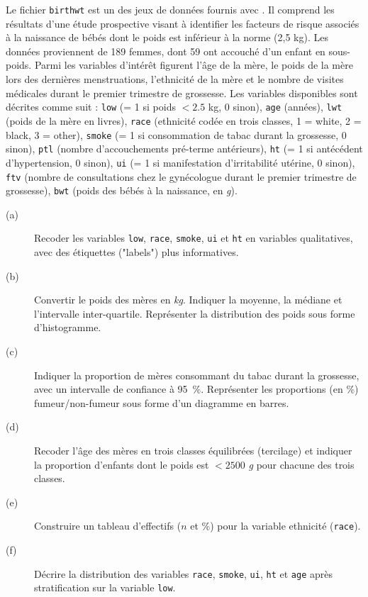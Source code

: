 \begin{exo}\label{exo:2.4}
Le fichier \texttt{birthwt} est un des jeux de données fournis avec \R. Il
comprend les résultats d'une étude prospective visant à identifier les
facteurs de risque associés à la naissance de bébés dont le poids est
inférieur à la norme (2,5 kg). Les données proviennent de 189 femmes, dont
59 ont accouché d'un enfant en sous-poids. Parmi les variables d'intérêt
figurent l'âge de la mère, le poids de la mère lors des dernières
menstruations, l'ethnicité de la mère et le nombre de visites médicales
durant le premier trimestre de grossesse.\autocite{hosmer89}
Les variables disponibles sont décrites comme suit : \texttt{low} (= 1 si
poids $<2.5$ kg, 0 sinon), \texttt{age} (années), \texttt{lwt} (poids de la
mère en livres), \texttt{race} (ethnicité codée en trois classes, 1 = white,
2 = black, 3 = other), \texttt{smoke} (= 1 si consommation de tabac durant
la grossesse, 0 sinon), \texttt{ptl} (nombre d'accouchements pré-terme
antérieurs), \texttt{ht} (= 1 si antécédent d'hypertension, 0 sinon),
\texttt{ui} (= 1 si manifestation d'irritabilité utérine, 0 sinon),
\texttt{ftv} (nombre de consultations chez le gynécologue durant le premier
trimestre de grossesse), \texttt{bwt} (poids des bébés à la naissance, en
\emph{g}).
\begin{description}
\item[(a)] Recoder les variables \texttt{low}, \texttt{race},
  \texttt{smoke}, \texttt{ui} et \texttt{ht} en variables
  qualitatives, avec des étiquettes ("labels") plus informatives.
\item[(b)] Convertir le poids des mères en \emph{kg}. Indiquer la moyenne, la
  médiane et l'intervalle inter-quartile. Représenter la distribution des
  poids sous forme d'histogramme.
\item[(c)] Indiquer la proportion de mères consommant du tabac durant la
  grossesse, avec un intervalle de confiance à 95~\%. Représenter les
  proportions (en \%) fumeur/non-fumeur sous forme d'un diagramme en
  barres.
\item[(d)] Recoder l'âge des mères en trois classes équilibrées (tercilage)
  et indiquer la proportion d'enfants dont le poids est $<2500$ \emph{g}
  pour chacune des trois classes.
\item[(e)] Construire un tableau d'effectifs ($n$ et \%) pour la variable
  ethnicité (\texttt{race}).  
\item[(f)] Décrire la distribution des variables \texttt{race},
  \texttt{smoke}, \texttt{ui}, \texttt{ht} et \texttt{age} après
  stratification sur la variable \texttt{low}.  
\end{description}
\end{exo}

